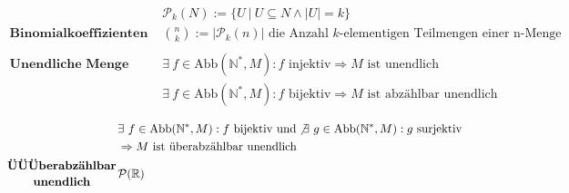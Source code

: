 \documentclass{article}
\begin{document}
\begin{align*}
					& \mathcal{P}_k(N) := \{U\ |\ U \subseteq N \wedge |U| = k\}\\
					\textbf{Binomialkoeffizienten } & \binom{n}{k} := |\mathcal{P}_k(n)| \text{ die Anzahl $k$-elementigen Teilmengen einer n-Menge}\\\\
					\textbf{Unendliche Menge } & \exists\ f \in \text{Abb}(\mathbb{N}^*, M): f \text{ injektiv} \Rightarrow M \text{ ist unendlich}\\
					& \exists\ f \in \text{Abb}(\mathbb{N}^*, M): f \text{ bijektiv} \Rightarrow M \text{ ist abz\"ahlbar unendlich}\\
			\end{align*}
			\begin{align*}
					& \exists\ f \in \text{Abb}(\mathbb{N}^*, M): f \text{ bijektiv} \text{ und} \not\exists\ g \in \text{Abb}(\mathbb{N}^*, M): g \text{ surjektiv}\\& \Rightarrow M \text{ ist \"uberabz\"ahlbar unendlich}\\
					\textbf{\"U\"U\"Uberabz\"ahlbar}\atop\textbf{ unendlich } & \mathcal{P}({\mathbb{R}})
				\end{align*}
\end{document}
